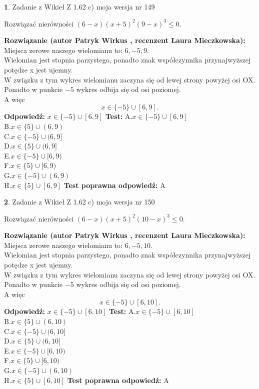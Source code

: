 \documentclass[12pt, a4paper]{article}
\theoremstyle{definition} %
\newtheorem{zad}{}
\newcommand{\zadStart}[1]{\begin{zad}#1\newline}
\newcommand{\zadStop}{\end{zad}}
\newcommand{\rozwStart}[2]{\noindent \textbf{Rozwiązanie (autor #1 , recenzent #2): }\newline}
\newcommand{\rozwStop}{\newline}
\newcommand{\odpStart}{\noindent \textbf{Odpowiedź:}\newline}
\newcommand{\odpStop}{\newline}
\newcommand{\testStart}{\noindent \textbf{Test:}\newline}
\newcommand{\testStop}{\newline}
\newcommand{\kluczStart}{\noindent \textbf{Test poprawna odpowiedź:}\newline}
\newcommand{\kluczStop}{\newline}
\begin{document}
\zadStart{Zadanie z Wikieł Z 1.62 c) moja wersja nr 149}

Rozwiązać nierówności $(6-x)(x+5)^{2}(9-x)^{3}\le0$.
\zadStop
\rozwStart{Patryk Wirkus}{Laura Mieczkowska}
Miejsca zerowe naszego wielomianu to: $6, -5, 9$.\\
Wielomian jest stopnia parzystego, ponadto znak współczynnika przy\linebreak najwyższej potędze x jest ujemny.\\ W związku z tym wykres wielomianu zaczyna się od lewej strony powyżej osi OX.\\
Ponadto w punkcie $-5$ wykres odbija się od osi poziomej.\\
A więc $$x \in \{-5\} \cup [6,9].$$
\rozwStop
\odpStart
$x \in \{-5\} \cup [6,9]$
\odpStop
\testStart
A.$x \in \{-5\} \cup [6,9]$\\
B.$x \in \{5\} \cup (6,9)$\\
C.$x \in \{-5\} \cup (6,9]$\\
D.$x \in \{5\} \cup (6,9]$\\
E.$x \in \{-5\} \cup [6,9)$\\
F.$x \in \{5\} \cup [6,9)$\\
G.$x \in \{-5\} \cup (6,9)$\\
H.$x \in \{5\} \cup [6,9]$
\testStop
\kluczStart
A
\kluczStop



\zadStart{Zadanie z Wikieł Z 1.62 c) moja wersja nr 150}

Rozwiązać nierówności $(6-x)(x+5)^{2}(10-x)^{3}\le0$.
\zadStop
\rozwStart{Patryk Wirkus}{Laura Mieczkowska}
Miejsca zerowe naszego wielomianu to: $6, -5, 10$.\\
Wielomian jest stopnia parzystego, ponadto znak współczynnika przy\linebreak najwyższej potędze x jest ujemny.\\ W związku z tym wykres wielomianu zaczyna się od lewej strony powyżej osi OX.\\
Ponadto w punkcie $-5$ wykres odbija się od osi poziomej.\\
A więc $$x \in \{-5\} \cup [6,10].$$
\rozwStop
\odpStart
$x \in \{-5\} \cup [6,10]$
\odpStop
\testStart
A.$x \in \{-5\} \cup [6,10]$\\
B.$x \in \{5\} \cup (6,10)$\\
C.$x \in \{-5\} \cup (6,10]$\\
D.$x \in \{5\} \cup (6,10]$\\
E.$x \in \{-5\} \cup [6,10)$\\
F.$x \in \{5\} \cup [6,10)$\\
G.$x \in \{-5\} \cup (6,10)$\\
H.$x \in \{5\} \cup [6,10]$
\testStop
\kluczStart
A
\kluczStop
\end{document}
